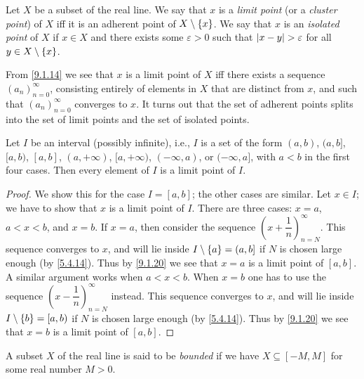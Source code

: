 \begin{defn}\label{9.1.18}
  Let \(X\) be a subset of the real line.
  We say that \(x\) is a \emph{limit point} (or a \emph{cluster point}) of \(X\) iff it is an adherent point of \(X \setminus \left\lbrace x\right\rbrace\).
  We say that \(x\) is an \emph{isolated point} of \(X\) if \(x \in X\) and there exists some \(\varepsilon > 0\) such that \(\left\lvert x - y\right\rvert > \varepsilon\) for all \(y \in X \setminus \left\lbrace x\right\rbrace\).
\end{defn}

\setcounter{thm}{19}
\begin{rmk}\label{9.1.20}
  From \cref{9.1.14} we see that \(x\) is a limit point of \(X\) iff there exists a sequence \((a_n)_{n = 0}^\infty\), consisting entirely of elements in \(X\) that are distinct from \(x\), and such that \((a_n)_{n = 0}^\infty\) converges to \(x\).
  It turns out that the set of adherent points splits into the set of limit points and the set of isolated points.
\end{rmk}

\begin{lem}\label{9.1.21}
  Let \(I\) be an interval (possibly infinite), i.e., \(I\) is a set of the form \((a, b)\), \((a, b]\), \([a, b)\), \([a, b]\), \((a, +\infty)\), \([a, +\infty)\), \((-\infty, a)\), or \((-\infty, a]\), with \(a < b\) in the first four cases.
  Then every element of \(I\) is a limit point of \(I\).
\end{lem}

\begin{proof}
  We show this for the case \(I = [a, b]\);
  the other cases are similar.
  Let \(x \in I\);
  we have to show that \(x\) is a limit point of \(I\).
  There are three cases: \(x = a\), \(a < x < b\), and \(x = b\).
  If \(x = a\), then consider the sequence \((x + \dfrac{1}{n})_{n = N}^\infty\).
  This sequence converges to \(x\), and will lie inside \(I \setminus \left\lbrace a\right\rbrace = (a, b]\) if \(N\) is chosen large enough (by \cref{5.4.14}).
  Thus by \cref{9.1.20} we see that \(x = a\) is a limit point of \([a, b]\).
  A similar argument works when \(a < x < b\).
  When \(x = b\) one has to use the sequence \((x - \dfrac{1}{n})_{n = N}^\infty\) instead.
  This sequence converges to \(x\), and will lie inside \(I \setminus \left\lbrace b\right\rbrace = [a, b)\) if \(N\) is chosen large enough (by \cref{5.4.14}).
  Thus by \cref{9.1.20} we see that \(x = b\) is a limit point of \([a, b]\).
\end{proof}

\begin{defn}\label{9.1.22}
  A subset \(X\) of the real line is said to be \emph{bounded} if we have \(X \subseteq [-M, M]\) for some real number \(M > 0\).
\end{defn}

